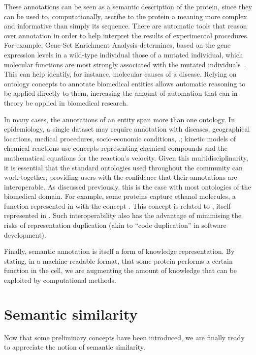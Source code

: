 These annotations can be seen as a semantic description of the protein, since they can be used to, computationally, ascribe to the protein a meaning more complex and informative than simply its sequence. There are automatic tools that reason over  annotation in order to help interpret the results of experimental procedures. For example, Gene-Set Enrichment Analysis determines, based on the gene expression levels in a wild-type individual \vs those of a mutated individual, which  molecular functions are most strongly associated with the mutated individuals~\citep{Subramanian2005}. This can help identify, for instance, molecular causes of a disease. Relying on ontology concepts to annotate biomedical entities allows automatic reasoning to be applied directly to them, increasing the amount of automation that can in theory be applied in biomedical research.

In many cases, the annotations of an entity span more than one ontology. In epidemiology, a single dataset may require annotation with diseases, geographical locations, medical procedures, socio-economic conditions, \etc.; kinetic models of chemical reactions use concepts representing chemical compounds and the mathematical equations for the reaction's velocity. Given this multidisciplinarity, it is essential that the standard ontologies used throughout the community can work together, providing users with the confidence that their annotations are interoperable. As discussed previously, this is the case with most ontologies of the biomedical domain. For example, some proteins capture ethanol molecules, a function represented in  with the concept . This concept is related to , itself represented in . Such interoperability also has the advantage of minimising the risks of representation duplication (akin to ``code duplication'' in software development).

Finally, semantic annotation is itself a form of knowledge representation. By stating, in a machine-readable format, that some protein performs a certain function in the cell, we are augmenting the amount of knowledge that can be exploited by computational methods.


\section{Semantic similarity} \label{sec:concepts/semantic-similarity}

Now that some preliminary concepts have been introduced, we are finally ready to appreciate the notion of semantic similarity.

